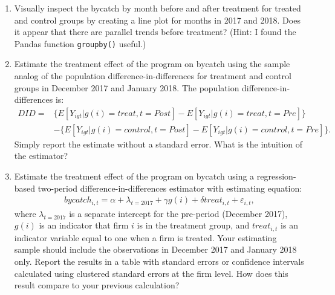 \documentclass{article}
\begin{document}
\begin{enumerate}
    \item Visually inspect the bycatch by month before and after treatment for treated and control groups by creating a line plot for months in 2017 and 2018.  Does it appear that there are parallel trends before treatment? (Hint: I found the Pandas function \verb!groupby()! useful.)
    \item Estimate the treatment effect of the program on bycatch using the sample analog of the population difference-in-differences for treatment and control groups in December 2017 and January 2018.  The population difference-in-differences is:
    \begin{align}
        DID =& \lbrace E[Y_{igt}|g(i)=treat, t=Post] - E[Y_{igt}|g(i) = treat, t=Pre] \rbrace \\
        &- \lbrace E[Y_{igt}|g(i) = control, t = Post] - E[Y_{igt}|g(i) = control, t = Pre] \rbrace.
    \end{align}
    Simply report the estimate without a standard error.  What is the intuition of the estimator?
    \item Estimate the treatment effect of the program on bycatch using a regression-based two-period difference-in-differences estimator with estimating equation:
    \begin{align}
        bycatch_{i,t} = \alpha + \lambda_{t=2017} + \gamma g(i) + \delta treat_{i,t} + \varepsilon_{i,t},
    \end{align}
    where $\lambda_{t=2017}$ is a separate intercept for the pre-period (December 2017), $g(i)$ is an indicator that firm $i$ is in the treatment group, and $treat_{i,t}$ is an indicator variable equal to one when a firm is treated.  Your estimating sample should include the observations in December 2017 and January 2018 only.  Report the results in a table with standard errors or confidence intervals calculated using clustered standard errors at the firm level.  How does this result compare to your previous calculation?
    
\end{enumerate}
\end{document}
